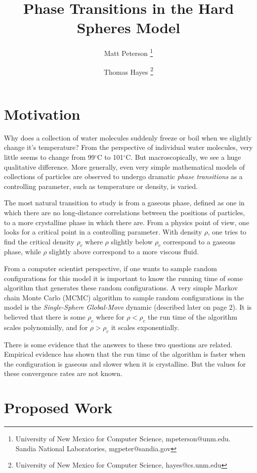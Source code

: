 \documentclass[a4paper,11pt]{article}
\title{Phase Transitions in the Hard Spheres Model}
\author{Matt Peterson \thanks{University of New Mexico for Computer Science, mpeterson@unm.edu. Sandia National Laboratories, mgpeter@sandia.gov} \and Thomas Hayes \thanks{University of New Mexico for Computer Science, hayes@cs.unm.edu}}
\begin{document}
\maketitle

\section*{Motivation}

Why does a collection of water molecules suddenly freeze or boil when we slightly change it's temperature?  From the perspective of individual water molecules, very little seems to change from 99$^\circ$C to 101$^\circ$C.  But macroscopically, we see a huge qualitative difference.  More generally, even very simple mathematical models of collections of particles are observed to undergo dramatic \textit{phase transitions} as a controlling parameter, such as temperature or density, is varied.

The most natural transition to study is from a gaseous phase, defined as one in which there are no long-distance correlations between the positions of particles, to a more crystalline phase in which there are.  From a physics point of view, one looks for a critical point in a controlling parameter.  With density $\rho$, one tries to find the critical density $\rho_c$ where $\rho$ slightly below $\rho_c$ correspond to a gaseous phase, while $\rho$ slightly above correspond to a more viscous fluid.

From a computer scientist perspective, if one wants to sample random configurations for this model it is important to know the running time of some algorithm that generates these random configurations.  A very simple Markov chain Monte Carlo (MCMC) algorithm to sample random configurations in the model is the \textit{Single-Sphere Global-Move} dynamic (described later on page 2).  It is believed that there is some $\rho_c$ where for $\rho < \rho_c$ the run time of the algorithm scales polynomially, and for $\rho > \rho_c$ it scales exponentially.

There is some evidence that the answers to these two questions are related.  Empirical evidence has shown that the run time of the algorithm is faster when the configuration is gaseous and slower when it is crystalline.  But the values for these convergence rates are not known.

\section*{Proposed Work}
\end{document}
